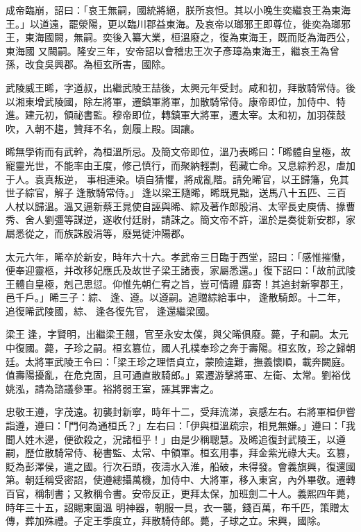\begin{pinyinscope}
 成帝臨崩，詔曰：「哀王無嗣，國統將絕，朕所哀怛。其以小晚生奕繼哀王為東海王。」以道遠，罷滎陽，更以臨川郡益東海。及哀帝以瑯邪王即尊位，徙奕為瑯邪王，東海國闕，無嗣。奕後入纂大業，桓溫廢之，復為東海王，既而貶為海西公，東海國
 又闕嗣。隆安三年，安帝詔以會稽忠王次子彥璋為東海王，繼哀王為曾孫，改食吳興郡。為桓玄所害，國除。



 武陵威王晞，字道叔，出繼武陵王喆後，太興元年受封。咸和初，拜散騎常侍。後以湘東增武陵國，除左將軍，遷鎮軍將軍，加散騎常侍。康帝即位，加侍中、特進。建元初，領祕書監。穆帝即位，轉鎮軍大將軍，遷太宰。太和初，加羽葆鼓吹，入朝不趨，贊拜不名，劍履上殿。固讓。



 晞無學術而有武幹，為桓溫所忌。及簡文帝即位，溫乃表晞曰：「晞體自皇極，故寵靈光世，不能率由王度，修己慎行，而聚納輕剽，苞藏亡命。又息綜矜忍，虐加于人。袁真叛逆，
 事相連染。頃自猜懼，將成亂階。請免晞官，以王歸籓，免其世子綜官，解子逢散騎常侍。」逢以梁王隨晞，晞既見黜，送馬八十五匹、三百人杖以歸溫。溫又逼新蔡王晁使自誣與晞、綜及著作郎殷涓、太宰長史庾倩、掾曹秀、舍人劉彊等謀逆，遂收付廷尉，請誅之。簡文帝不許，溫於是奏徙新安郡，家屬悉從之，而族誅殷涓等，廢晃徙沖陽郡。



 太元六年，晞卒於新安，時年六十六。孝武帝三日臨于西堂，詔曰：「感惟摧慟，便奉迎靈柩，并改移妃應氏及故世子梁王諸喪，家屬悉還。」復下詔曰：「故前武陵王體自皇極，剋己思愆。仰惟先朝仁宥之旨，豈可情禮
 靡寄！其追封新寧郡王，邑千戶。」晞三子：綜、逢、遵。以遵嗣。追贈綜給事中，逢散騎郎。十二年，追復晞武陵國，綜、逢各復先官，逢還繼梁國。



 梁王逢，字賢明，出繼梁王翹，官至永安太僕，與父晞俱廢。薨，子和嗣。太元中復國。薨，子珍之嗣。桓玄篡位，國人孔樸奉珍之奔于壽陽。桓玄敗，珍之歸朝廷。太將軍武陵王令曰：「梁王珍之理悟貞立，蒙險違難，撫義懷順，載奔闕庭。值壽陽擾亂，在危克固，且可通直散騎郎。」累遷游擊將軍、左衛、太常。劉裕伐姚泓，請為諮議參軍。裕將弱王室，誣其罪害之。



 忠敬王遵，字茂遠。初襲封新寧，時年十二，受拜流涕，哀感左右。右將軍桓伊嘗詣遵，遵曰：「門何為通桓氏？」左右曰：「伊與桓溫疏宗，相見無嫌。」遵曰：「我聞人姓木邊，便欲殺之，況諸桓乎！」由是少稱聰慧。及晞追復封武陵王，以遵嗣，歷位散騎常侍、秘書監、太常、中領軍。桓玄用事，拜金紫光祿大夫。玄篡，貶為彭澤侯，遣之國。行次石頭，夜濤水入淮，船破，未得發。會義旗興，復還國第。朝廷稱受密詔，使遵總攝萬機，加侍中、大將軍，移入東宮，內外畢敬。遷轉百官，稱制書；又教稱令書。安帝反正，更拜太保，加班劍二十人。義熙四年薨，時年三十五，詔賜東園溫
 明神器，朝服一具，衣一襲，錢百萬，布千匹，策贈太傳，葬加殊禮。子定王季度立，拜散騎侍郎。薨，子球之立。宋興，國除。




\end{pinyinscope}
